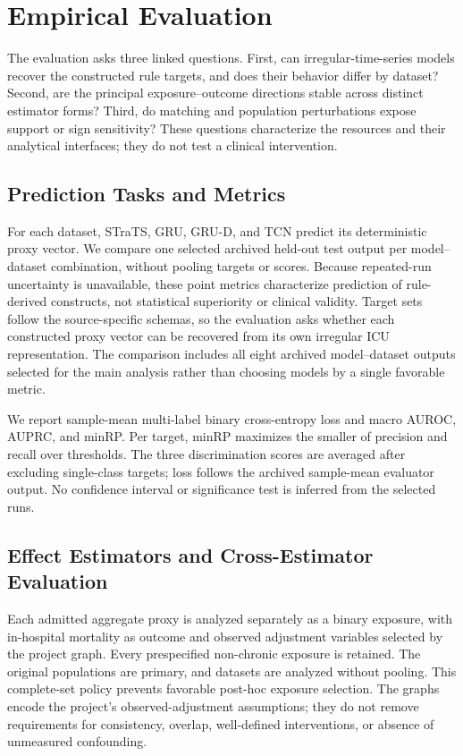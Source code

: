 \documentclass[letterpaper]{article}
\begin{document}
\section{Empirical Evaluation}

The evaluation asks three linked questions. First, can irregular-time-series
models recover the constructed rule targets, and does their behavior differ by
dataset? Second, are the principal exposure--outcome directions stable across
distinct estimator forms? Third, do matching and population perturbations expose
support or sign sensitivity? These questions characterize the resources and
their analytical interfaces; they do not test a clinical intervention.

\subsection{Prediction Tasks and Metrics}

For each dataset, STraTS, GRU, GRU-D, and TCN predict its deterministic proxy
vector. We compare one selected archived held-out test output per model--dataset
combination, without pooling targets or scores. Because repeated-run uncertainty
is unavailable, these point metrics characterize prediction of rule-derived
constructs, not statistical superiority or clinical validity. Target sets follow
the source-specific schemas, so the evaluation asks whether each constructed
proxy vector can be recovered from its own irregular ICU representation.
The comparison includes all eight archived model--dataset outputs selected for
the main analysis rather than choosing models by a single favorable metric.

We report sample-mean multi-label binary cross-entropy loss and macro AUROC,
AUPRC, and minRP. Per target, minRP maximizes the smaller of precision and recall
over thresholds. The three discrimination scores are averaged after excluding
single-class targets; loss follows the archived sample-mean evaluator output.
No confidence interval or significance test is inferred from the selected runs.

\subsection{Effect Estimators and Cross-Estimator Evaluation}

Each admitted aggregate proxy is analyzed separately as a binary exposure,
with in-hospital mortality as outcome and observed adjustment variables selected
by the project graph. Every prespecified non-chronic exposure is retained. The
original populations are primary, and datasets are analyzed without pooling.
This complete-set policy prevents favorable post-hoc exposure selection. The
graphs encode the project's observed-adjustment assumptions; they do not remove
requirements for consistency, overlap, well-defined interventions, or absence
of unmeasured confounding.
\end{document}
